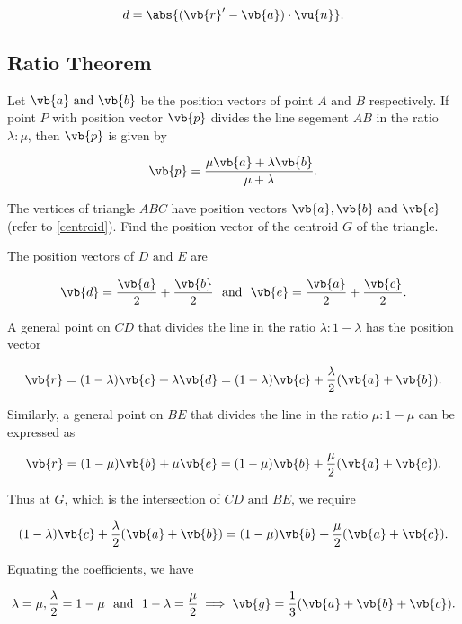 \documentclass[a4paper,12pt]{report}
\begin{document}
\begin{equation}
    d = \abs{(\vb{r} ' - \vb{a} ) \cdot \vu{n} }. 
\end{equation}

\subsection{Ratio Theorem}

Let \(\vb{a} \text { and } \vb{b} \) be the position vectors of point \(A \text { and } B\) respectively. If point \(P\) with position vector \(\vb{p} \) divides the line segement \(AB\) in the ratio \(\lambda : \mu \), then \(\vb{p} \) is given by 

\begin{equation}
    \vb{p} = \frac{\mu \vb{a} + \lambda \vb{b} }{\mu + \lambda }. 
\end{equation}

{The vertices of triangle \(ABC\) have position vectors \(\vb{a} ,\vb{b} \text { and } \vb{c} \) (refer to \cref{centroid}). Find the position vector of the centroid \(G\) of the triangle.}
{The position vectors of \(D \text { and } E\) are 

\begin{equation}
    \vb{d} = \frac{\vb{a} }{2} + \frac{\vb{b} }{2} ~\text { and }~ \vb{e} = \frac{\vb{a} }{2} + \frac{\vb{c} }{2}.    
\end{equation}

A general point on \(CD\) that divides the line in the ratio \(\lambda : 1- \lambda \) has the position vector 

\begin{equation}
    \vb{r} = (1-\lambda )\vb{c} + \lambda \vb{d} = (1-\lambda )\vb{c} + \frac{\lambda }{2} (\vb{a} +\vb{b} ). 
\end{equation}

Similarly, a general point on \(BE\) that divides the line in the ratio \(\mu :1-\mu \) can be expressed as 

\begin{equation}
    \vb{r} = (1-\mu )\vb{b} + \mu \vb{e} = (1-\mu )\vb{b} + \frac{\mu }{2}(\vb{a} + \vb{c} ). 
\end{equation}

Thus at \(G\), which is the intersection of \(CD \text { and } BE\), we require

\begin{equation}
    (1-\lambda )\vb{c} + \frac{\lambda }{2}(\vb{a} +\vb{b} ) = (1-\mu )\vb{b} + \frac{\mu }{2}(\vb{a} +\vb{c} ).
\end{equation}

Equating the coefficients, we have

\begin{equation}
    \lambda = \mu , \frac{\lambda }{2} = 1-\mu ~\text { and }~ 1-\lambda = \frac{\mu }{2} \implies \vb{g} = \frac{1}{3}(\vb{a} +\vb{b} +\vb{c} ). 
\end{equation}







} 
\end{document}

